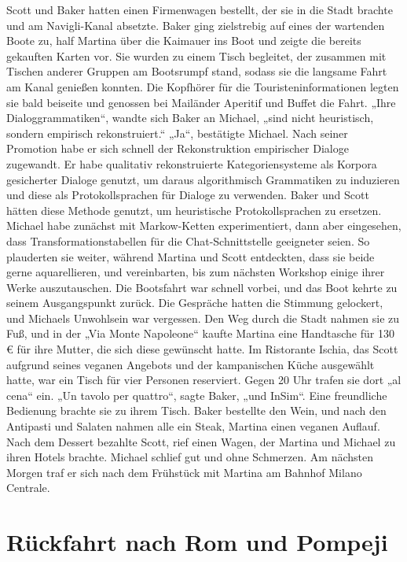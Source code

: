 \documentclass[
]{article}
\begin{document}
Scott und Baker hatten einen Firmenwagen bestellt, der sie in die Stadt
brachte und am Navigli-Kanal absetzte. Baker ging zielstrebig auf eines
der wartenden Boote zu, half Martina über die Kaimauer ins Boot und
zeigte die bereits gekauften Karten vor. Sie wurden zu einem Tisch
begleitet, der zusammen mit Tischen anderer Gruppen am Bootsrumpf stand,
sodass sie die langsame Fahrt am Kanal genießen konnten. Die Kopfhörer
für die Touristeninformationen legten sie bald beiseite und genossen bei
Mailänder Aperitif und Buffet die Fahrt. „Ihre Dialoggrammatiken``,
wandte sich Baker an Michael, „sind nicht heuristisch, sondern empirisch
rekonstruiert.`` „Ja``, bestätigte Michael. Nach seiner Promotion habe
er sich schnell der Rekonstruktion empirischer Dialoge zugewandt. Er
habe qualitativ rekonstruierte Kategoriensysteme als Korpora gesicherter
Dialoge genutzt, um daraus algorithmisch Grammatiken zu induzieren und
diese als Protokollsprachen für Dialoge zu verwenden. Baker und Scott
hätten diese Methode genutzt, um heuristische Protokollsprachen zu
ersetzen. Michael habe zunächst mit Markow-Ketten experimentiert, dann
aber eingesehen, dass Transformationstabellen für die Chat-Schnittstelle
geeigneter seien. So plauderten sie weiter, während Martina und Scott
entdeckten, dass sie beide gerne aquarellieren, und vereinbarten, bis
zum nächsten Workshop einige ihrer Werke auszutauschen. Die Bootsfahrt
war schnell vorbei, und das Boot kehrte zu seinem Ausgangspunkt zurück.
Die Gespräche hatten die Stimmung gelockert, und Michaels Unwohlsein war
vergessen. Den Weg durch die Stadt nahmen sie zu Fuß, und in der „Via
Monte Napoleone`` kaufte Martina eine Handtasche für 130 € für ihre
Mutter, die sich diese gewünscht hatte. Im Ristorante Ischia, das Scott
aufgrund seines veganen Angebots und der kampanischen Küche ausgewählt
hatte, war ein Tisch für vier Personen reserviert. Gegen 20 Uhr trafen
sie dort „al cena`` ein. „Un tavolo per quattro``, sagte Baker, „und
InSim``. Eine freundliche Bedienung brachte sie zu ihrem Tisch. Baker
bestellte den Wein, und nach den Antipasti und Salaten nahmen alle ein
Steak, Martina einen veganen Auflauf. Nach dem Dessert bezahlte Scott,
rief einen Wagen, der Martina und Michael zu ihren Hotels brachte.
Michael schlief gut und ohne Schmerzen. Am nächsten Morgen traf er sich
nach dem Frühstück mit Martina am Bahnhof Milano Centrale.

\section{Rückfahrt nach Rom und
Pompeji}\label{ruxfcckfahrt-nach-rom-und-pompeji}
\end{document}
